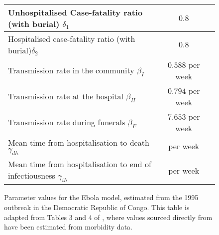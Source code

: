 \begin{figure}
\begin{center}
\begin{tabular}{|p{5cm}|c|p{5cm}|}
				Unhospitalised Case-fatality ratio (with burial) \(\delta_1\)           & \(0.8\)             & \citet{KhanEtAl_1999_ReemergenceEbolaHemorrhagic}                                                                                      \\ \hline
				Hospitalised case-fatality ratio (with burial)\(\delta_2\)              & \(0.8\)             & \citet{KhanEtAl_1999_ReemergenceEbolaHemorrhagic}                                                                                      \\ \hline
				Transmission rate in the community \(\beta_I\)                          & \(0.588\) per week  & \citet{LegrandEtAl_2007_UnderstandingDynamicsEbola}                                                                                    \\ \hline
				Transmission rate at the hospital \(\beta_H\)                           & \(0.794\) per week  & \citet{LegrandEtAl_2007_UnderstandingDynamicsEbola}                                                                                    \\ \hline
				Transmission rate during funerals \(\beta_F\)                           & \(7.653\) per week  & \citet{LegrandEtAl_2007_UnderstandingDynamicsEbola}                                                                                    \\ \hline
				Mean time from hospitalisation to death \(\gamma_{dh}\)                 & per week            & \citet{LegrandEtAl_2007_UnderstandingDynamicsEbola}                                                                                    \\ \hline
				Mean time from hospitalisation to end of infectiousness \(\gamma_{ih}\) & per week            & \citet{LegrandEtAl_2007_UnderstandingDynamicsEbola}                                                                                    \\ \hline
			\end{tabular}
		\end{center}
		\caption{Parameter values for the Ebola model, estimated from the 1995 outbreak in the Democratic Republic of Congo.
			This table is adapted from Tables 3 and 4 of \citet{LegrandEtAl_2007_UnderstandingDynamicsEbola}, where values sourced directly from \citet{LegrandEtAl_2007_UnderstandingDynamicsEbola} have been estimated from morbidity data.}
		\label{tab:ebola_param_vals}
	\end{figure}

